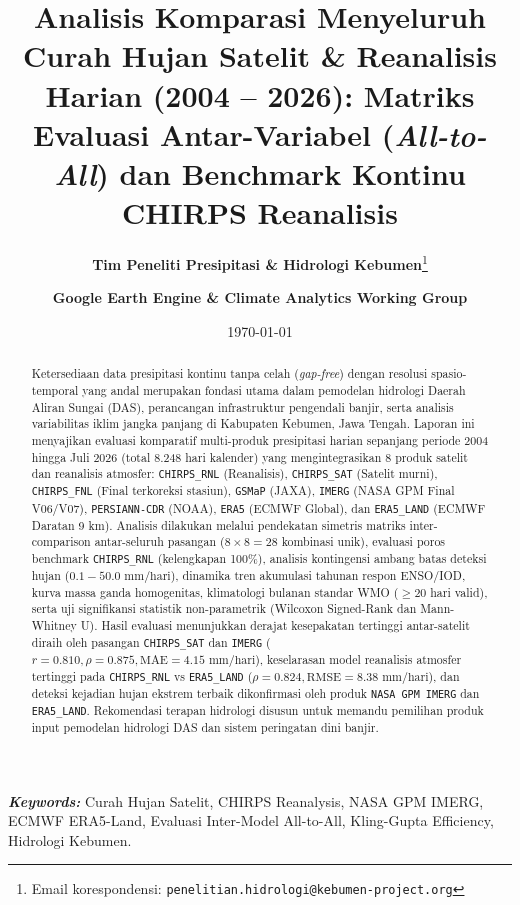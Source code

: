 \documentclass[11pt,a4paper]{article}
\title{\vspace{-1.2cm}\textbf{\Large Analisis Komparasi Menyeluruh Curah Hujan Satelit \& Reanalisis Harian (2004 -- 2026): Matriks Evaluasi Antar-Variabel (\textit{All-to-All}) dan Benchmark Kontinu CHIRPS Reanalisis}}
\author[1]{\textbf{Tim Peneliti Presipitasi \& Hidrologi Kebumen}\thanks{Email korespondensi: \texttt{penelitian.hidrologi@kebumen-project.org}}}
\author[1]{\textbf{Google Earth Engine \& Climate Analytics Working Group}}
\affil[1]{\small Laboratorium Hidrometeorologi \& Sains Data Geospasial, Proyek Pemodelan Presipitasi Kebumen}
\date{\small\today}
\begin{document}
\maketitle

\begin{abstract}
\noindent Ketersediaan data presipitasi kontinu tanpa celah (\textit{gap-free}) dengan resolusi spasio-temporal yang andal merupakan fondasi utama dalam pemodelan hidrologi Daerah Aliran Sungai (DAS), perancangan infrastruktur pengendali banjir, serta analisis variabilitas iklim jangka panjang di Kabupaten Kebumen, Jawa Tengah. Laporan ini menyajikan evaluasi komparatif multi-produk presipitasi harian sepanjang periode 2004 hingga Juli 2026 (total 8.248 hari kalender) yang mengintegrasikan 8 produk satelit dan reanalisis atmosfer: \texttt{CHIRPS\_RNL} (Reanalisis), \texttt{CHIRPS\_SAT} (Satelit murni), \texttt{CHIRPS\_FNL} (Final terkoreksi stasiun), \texttt{GSMaP} (JAXA), \texttt{IMERG} (NASA GPM Final V06/V07), \texttt{PERSIANN-CDR} (NOAA), \texttt{ERA5} (ECMWF Global), dan \texttt{ERA5\_LAND} (ECMWF Daratan 9 km). Analisis dilakukan melalui pendekatan simetris matriks inter-comparison antar-seluruh pasangan ($8 \times 8 = 28$ kombinasi unik), evaluasi poros benchmark \texttt{CHIRPS\_RNL} (kelengkapan 100\%), analisis kontingensi ambang batas deteksi hujan ($0.1 - 50.0\text{ mm/hari}$), dinamika tren akumulasi tahunan respon ENSO/IOD, kurva massa ganda homogenitas, klimatologi bulanan standar WMO ($\ge 20$ hari valid), serta uji signifikansi statistik non-parametrik (Wilcoxon Signed-Rank dan Mann-Whitney U). Hasil evaluasi menunjukkan derajat kesepakatan tertinggi antar-satelit diraih oleh pasangan \texttt{CHIRPS\_SAT} dan \texttt{IMERG} ($r = 0.810, \rho = 0.875, \text{MAE} = 4.15\text{ mm/hari}$), keselarasan model reanalisis atmosfer tertinggi pada \texttt{CHIRPS\_RNL} vs \texttt{ERA5\_LAND} ($\rho = 0.824, \text{RMSE} = 8.38\text{ mm/hari}$), dan deteksi kejadian hujan ekstrem terbaik dikonfirmasi oleh produk \texttt{NASA GPM IMERG} dan \texttt{ERA5\_LAND}. Rekomendasi terapan hidrologi disusun untuk memandu pemilihan produk input pemodelan hidrologi DAS dan sistem peringatan dini banjir.
\end{abstract}

\vspace{0.2cm}
\noindent\textbf{\textit{Keywords:}} Curah Hujan Satelit, CHIRPS Reanalysis, NASA GPM IMERG, ECMWF ERA5-Land, Evaluasi Inter-Model All-to-All, Kling-Gupta Efficiency, Hidrologi Kebumen.
\end{document}

